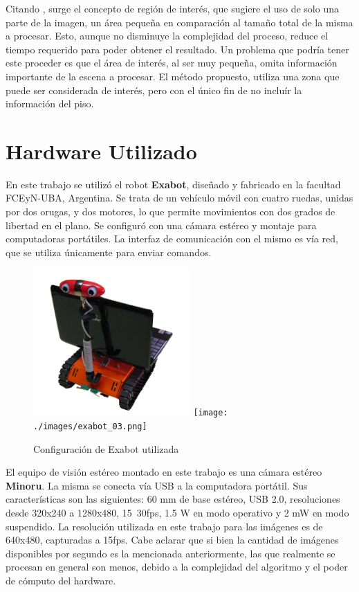 \documentclass[journal]{IEEEtran}
\begin{document}
Citando \cite{H09}, surge el concepto de regi\'on de inter\'es, que sugiere el uso de solo una parte de la imagen, un \'area peque\~na en comparaci\'on al tama\~no total de la misma a procesar. Esto, aunque no disminuye la complejidad del proceso, reduce el tiempo requerido para poder obtener el resultado. Un problema que podr\'ia tener este proceder es que el \'area de inter\'es, al ser muy peque\~na, omita informaci\'on importante de la escena a procesar. El m\'etodo propuesto, utiliza una zona que puede ser considerada de inter\'es, pero con el \'unico fin de no inclu\'ir la informaci\'on del piso.

\section{Hardware Utilizado}
\label{sec:hardware}


En este trabajo se utiliz\'o el robot {\bf Exabot}, dise\~nado y fabricado en la facultad FCEyN-UBA, Argentina. Se trata de un veh\'iculo m\'ovil con cuatro ruedas, unidas por dos orugas, y dos motores, lo que permite movimientos con dos grados de libertad en el plano. Se configur\'o con una c\'amara est\'ereo y montaje para computadoras port\'atiles. La interfaz de comunicaci\'on con el mismo es v\'ia red, que se utiliza \'unicamente para enviar comandos.

\begin{figure}[ht]
	\begin{center}
		\includegraphics[width=6cm]{./images/exabot_04.png}
		\texttt{[image: ./images/exabot\_03.png]}
		\caption{Configuraci\'on de Exabot utilizada}
	\end{center}
\end{figure}

El equipo de visi\'on est\'ereo montado en este trabajo es una c\'amara est\'ereo {\bf Minoru}. La misma se conecta v\'ia USB a la computadora port\'atil. Sus caracter\'isticas son las siguientes: 60 mm de base est\'ereo, USB 2.0, resoluciones desde 320x240 a 1280x480, 15~30fps, 1.5 W en modo operativo y 2 mW en modo suspendido. La resoluci\'on utilizada en este trabajo para las im\'agenes es de 640x480, capturadas a 15fps. Cabe aclarar que si bien la cantidad de im\'agenes disponibles por segundo es la mencionada anteriormente, las que realmente se procesan en general son menos, debido a la complejidad del algoritmo y el poder de c\'omputo del hardware.
\end{document}
